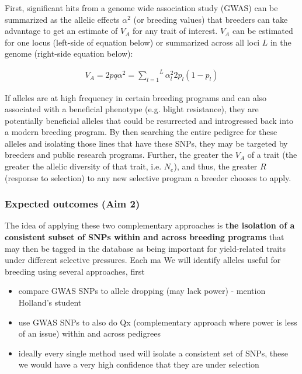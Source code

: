 \documentclass[final,12pt]{article}
\begin{document}
First, significant hits from a genome wide association study (GWAS)  can be summarized as the allelic effects $\alpha^{2}$ (or breeding values) that breeders can take advantage to get an estimate of $V_{A}$ for any trait of interest. $V_{A}$ can be estimated for one locus (left-side of equation below) or summarized across all loci $L$ in the genome (right-side equation below):

  \begin{align}
    V_A = 2pq\alpha^2
     = \overset{L}{\underset{l=1}{\sum}}\alpha^2_l2p_l(1-p_l)
  \end{align}

If alleles are at high frequency in certain breeding programs and can also associated with a beneficial phenotype (e.g. blight resistance), they are potentially beneficial alleles that could be resurrected and introgressed back into a modern breeding program. 
By then searching the entire pedigree for these alleles and isolating those lines that have these SNPs, they may be targeted by breeders and public research programs.
Further, the greater the $V_A$ of a trait (the greater the allelic diversity of that trait, i.e. $N_{e}$), and thus, the greater $R$ (response to selection) to any new selective program a breeder chooses to apply.


\subsubsection*{Expected outcomes (Aim 2)}

The idea of applying these two complementary approaches is \textbf{the isolation of a consistent subset of SNPs within and across breeding programs} that may then be tagged in the database as being important for yield-related traits under different selective pressures.
Each ma 
We will identify alleles useful for breeding using several approaches, first
\begin{itemize}
	\item compare GWAS SNPs to allele dropping (may lack power) - mention Holland's student
	\item use GWAS SNPs to also do Qx (complementary approach where power is less of an issue) within and across pedigrees
	\item ideally every single method used will isolate a consistent set of SNPs, these we would have a very high confidence that they are under selection
\end{itemize}
\end{document}
